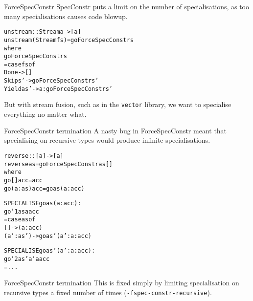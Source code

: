 \documentclass[t]{beamer}
\newcommand{\oomph}[1]{\textcolor[rgb]{0.0,0.5,0.9}{#1}}
\begin{document}
\begin{frame}[fragile]{ForceSpecConstr}
SpecConstr puts a limit on the number of specialisations,
as too many specialisations causes code blowup.
\begin{alltt}
unstream :: Stream a -> [a]
unstream (Stream f s) = go \oomph{ForceSpecConstr} s
 where
  go \oomph{ForceSpecConstr} s
   = case f s of
     Done       -> []
     Skip    s' ->      go \oomph{ForceSpecConstr} s'
     Yield a s' -> a :  go \oomph{ForceSpecConstr} s'
\end{alltt}

But with stream fusion, such as in the \verb/vector/ library, we want to specialise everything no matter what.
\end{frame}

\begin{frame}[fragile]{ForceSpecConstr termination}
A nasty bug in ForceSpecConstr meant that specialising on recursive types would produce infinite specialisations.

\begin{alltt}
reverse :: [a] -> [a]
reverse as = go ForceSpecConstr as []
 where
  go []     acc = acc
  go (a:as) acc = \oomph{go as (a:acc)}

SPECIALISE \oomph{go as (a:acc)}:
go'1 as a acc
 = case as of
    [] -> (a:acc)
    (a':as') -> \oomph{go as' (a':a:acc)}

SPECIALISE \oomph{go as' (a':a:acc)}:
go'2 as' a' a acc
 = ...
\end{alltt}
\end{frame}

\begin{frame}[fragile]{ForceSpecConstr termination}
This is fixed simply by limiting specialisation on recursive types a fixed number of times (\verb/-fspec-constr-recursive/).

\end{frame}


\end{document}
